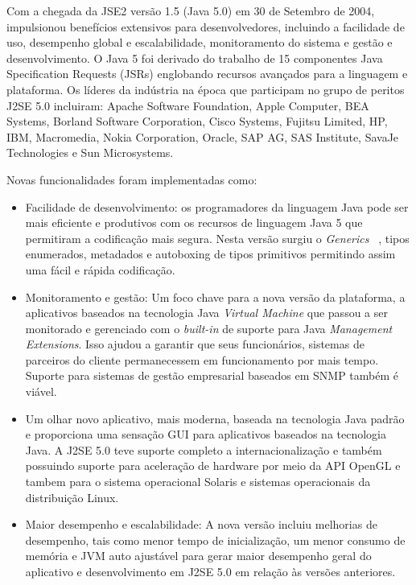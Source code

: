 Com a chegada da \acs{JSE2} versão 1.5 (Java 5.0) em 30 de Setembro de 2004, impulsionou benefícios extensivos para desenvolvedores, incluindo a facilidade de uso, desempenho global e escalabilidade, monitoramento do sistema e gestão e desenvolvimento. O Java 5 foi derivado do trabalho de 15 componentes Java Specification Requests (JSRs) englobando recursos avançados para a linguagem e plataforma. Os líderes da indústria na época que participam no grupo de peritos J2SE 5.0 incluiram: Apache Software Foundation, Apple Computer, BEA Systems, Borland Software Corporation, Cisco Systems, Fujitsu Limited, HP, IBM, Macromedia, Nokia Corporation, Oracle, SAP AG, SAS Institute, SavaJe Technologies e Sun Microsystems.

Novas funcionalidades foram implementadas como:

\begin{itemize}
  \item Facilidade de desenvolvimento: os programadores da linguagem Java pode ser mais eficiente e produtivos com os recursos de linguagem Java 5 que permitiram a codificação mais segura. Nesta versão surgiu o {\it Generics} ~\cite{OracleGenerics, bracha1998gj}, tipos enumerados, metadados e autoboxing de tipos primitivos permitindo assim uma fácil e rápida codificação.
  
  \item Monitoramento e gestão: Um foco chave para a nova versão da plataforma, a aplicativos baseados na tecnologia Java {\it Virtual Machine} que passou a ser monitorado e gerenciado com o {\it built-in} de suporte para Java {\it Management Extensions}. Isso ajudou a garantir que seus funcionários, sistemas de parceiros do cliente permanecessem em funcionamento por mais tempo. Suporte para sistemas de gestão empresarial baseados em SNMP também é viável.
  
  \item Um olhar novo aplicativo, mais moderna, baseada na tecnologia Java padrão e proporciona uma sensação GUI para aplicativos baseados na tecnologia Java. A J2SE 5.0 teve suporte completo a internacionalização e também possuindo suporte para aceleração de hardware por meio da API OpenGL e tambem para o sistema operacional Solaris e sistemas operacionais da distribuição Linux.
  
  \item Maior desempenho e escalabilidade: A nova versão incluiu melhorias de desempenho, tais como menor tempo de inicialização, um menor consumo de memória e JVM auto ajustável para gerar maior desempenho geral do aplicativo e desenvolvimento em J2SE 5.0 em relação às versões anteriores.
\end{itemize}


